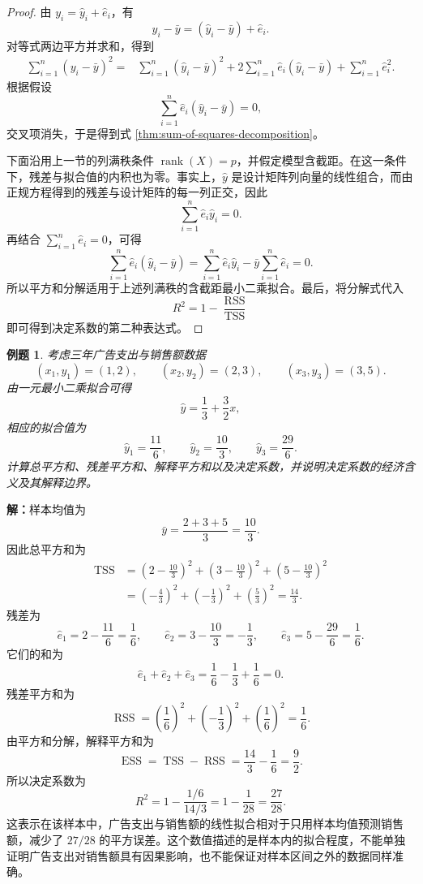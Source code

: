 \documentclass[UTF8,fontset=fandol,11pt]{ctexart}
\newtheorem{example}[definition]{例题}
\begin{document}
\begin{proof}
由 $y_i=\hat y_i+\hat e_i$，有
\[
y_i-\bar y=(\hat y_i-\bar y)+\hat e_i.
\]
对等式两边平方并求和，得到
\[
\begin{aligned}
\sum_{i=1}^{n}(y_i-\bar y)^2
={}&\sum_{i=1}^{n}(\hat y_i-\bar y)^2
+2\sum_{i=1}^{n}\hat e_i(\hat y_i-\bar y)
+\sum_{i=1}^{n}\hat e_i^2.
\end{aligned}
\]
根据假设
\[
\sum_{i=1}^{n}\hat e_i(\hat y_i-\bar y)=0,
\]
交叉项消失，于是得到式 \eqref{thm:sum-of-squares-decomposition}。

下面沿用上一节的列满秩条件 $\operatorname{rank}(X)=p$，并假定模型含截距。在这一条件下，残差与拟合值的内积也为零。事实上，\(\hat y\) 是设计矩阵列向量的线性组合，而由正规方程得到的残差与设计矩阵的每一列正交，因此
\[
\sum_{i=1}^{n}\hat e_i\hat y_i=0.
\]
再结合 \(\sum_{i=1}^{n}\hat e_i=0\)，可得
\[
\sum_{i=1}^{n}\hat e_i(\hat y_i-\bar y)
=\sum_{i=1}^{n}\hat e_i\hat y_i-\bar y\sum_{i=1}^{n}\hat e_i=0.
\]
所以平方和分解适用于上述列满秩的含截距最小二乘拟合。最后，将分解式代入
\[
R^2=1-\frac{\operatorname{RSS}}{\operatorname{TSS}}
\]
即可得到决定系数的第二种表达式。
\end{proof}
\begin{example}
考虑三年广告支出与销售额数据
\[
(x_1,y_1)=(1,2),\qquad (x_2,y_2)=(2,3),\qquad (x_3,y_3)=(3,5).
\]
由一元最小二乘拟合可得
\[
\hat y=\frac{1}{3}+\frac{3}{2}x,
\]
相应的拟合值为
\[
\hat y_1=\frac{11}{6},\qquad
\hat y_2=\frac{10}{3},\qquad
\hat y_3=\frac{29}{6}.
\]
计算总平方和、残差平方和、解释平方和以及决定系数，并说明决定系数的经济含义及其解释边界。
\end{example}
\par\noindent\textbf{解：}样本均值为
\[
\bar y=\frac{2+3+5}{3}=\frac{10}{3}.
\]
因此总平方和为
\[
\begin{aligned}
\operatorname{TSS}
&=\left(2-\frac{10}{3}\right)^2
+\left(3-\frac{10}{3}\right)^2
+\left(5-\frac{10}{3}\right)^2\\
&=\left(-\frac{4}{3}\right)^2
+\left(-\frac{1}{3}\right)^2
+\left(\frac{5}{3}\right)^2
=\frac{14}{3}.
\end{aligned}
\]
残差为
\[
\hat e_1=2-\frac{11}{6}=\frac{1}{6},
\qquad
\hat e_2=3-\frac{10}{3}=-\frac{1}{3},
\qquad
\hat e_3=5-\frac{29}{6}=\frac{1}{6}.
\]
它们的和为
\[
\hat e_1+\hat e_2+\hat e_3
=\frac{1}{6}-\frac{1}{3}+\frac{1}{6}=0.
\]
残差平方和为
\[
\operatorname{RSS}
=\left(\frac{1}{6}\right)^2
+\left(-\frac{1}{3}\right)^2
+\left(\frac{1}{6}\right)^2
=\frac{1}{6}.
\]
由平方和分解，解释平方和为
\[
\operatorname{ESS}=\operatorname{TSS}-\operatorname{RSS}
=\frac{14}{3}-\frac{1}{6}=\frac{9}{2}.
\]
所以决定系数为
\[
R^2=1-\frac{1/6}{14/3}
=1-\frac{1}{28}
=\frac{27}{28}.
\]
这表示在该样本中，广告支出与销售额的线性拟合相对于只用样本均值预测销售额，减少了 $27/28$ 的平方误差。这个数值描述的是样本内的拟合程度，不能单独证明广告支出对销售额具有因果影响，也不能保证对样本区间之外的数据同样准确。
\end{document}
